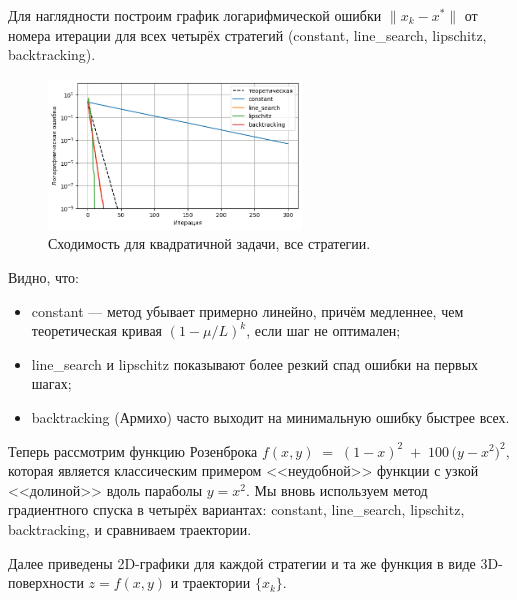 \documentclass[a4paper,12pt]{article}
\begin{document}
Для наглядности построим график логарифмической ошибки $\|x_k - x^*\|$ от номера итерации для всех четырёх стратегий (constant, line\_search, lipschitz, backtracking).
\begin{figure}[H]
    \centering
    \includegraphics[width=0.6\textwidth]{images/task2/convergence_x_error_all_strategies.png}
    \caption{Сходимость для квадратичной задачи, все стратегии.}
\end{figure}
\noindent
Видно, что:
\begin{itemize}
    \item constant --- метод убывает примерно линейно, причём медленнее, чем теоретическая кривая $(1-\mu/L)^k$, если шаг не оптимален;
    \item line\_search и lipschitz показывают более резкий спад ошибки на первых шагах;
    \item backtracking (Армихо) часто выходит на минимальную ошибку быстрее всех.
\end{itemize}
\noindent
Теперь рассмотрим функцию Розенброка
$ f(x,y) \;=\; (1 - x)^2 \;+\; 100\,\bigl(y - x^2\bigr)^2,$
которая является классическим примером <<неудобной>> функции с узкой <<долиной>> вдоль параболы $y=x^2$. Мы вновь используем метод градиентного спуска в четырёх вариантах: constant, line\_search, lipschitz, backtracking, и сравниваем траектории.

Далее приведены 2D-графики для каждой стратегии и та же функция в виде 3D-поверхности $z=f(x,y)$ и траектории $\{x_k\}$.
\end{document}
